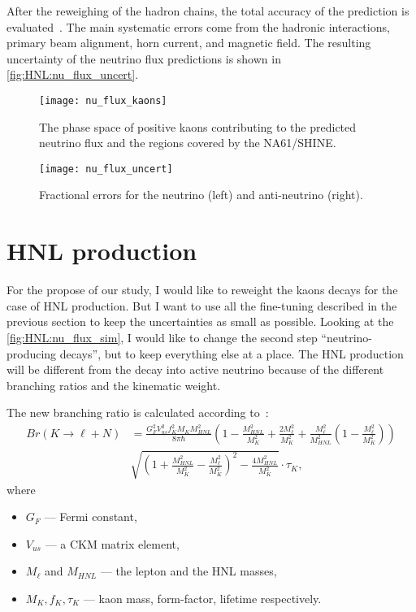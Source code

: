 \documentclass[../main.tex]{subfiles}
\begin{document}
After the reweighing of the hadron chains, the total accuracy of the prediction is evaluated~\cite{Abe2013}. The main systematic errors come from the hadronic interactions, primary beam alignment, horn current, and magnetic field. The resulting uncertainty of the neutrino flux predictions is shown in \autoref{fig:HNL:nu_flux_uncert}.

\begin{figure}[!ht]
    \begin{minipage}[!ht]{0.49\linewidth}
        \centering
        \texttt{[image: nu\_flux\_kaons]}
        \caption{The phase space of positive kaons contributing to the predicted neutrino flux and the regions covered by the NA61/SHINE.}
        \label{fig:HNL:kaon_ps}
    \end{minipage}
    \hfill
    \begin{minipage}[!ht]{0.49\linewidth}
        \centering
        \texttt{[image: nu\_flux\_uncert]}
        \caption{Fractional errors for the neutrino (left) and anti-neutrino (right).}
        \label{fig:HNL:nu_flux_uncert}
    \end{minipage}
\end{figure}


\section{HNL production}
For the propose of our study, I would like to reweight the kaons decays for the case of HNL production. But I want to use all the fine-tuning described in the previous section to keep the uncertainties as small as possible. Looking at the \autoref{fig:HNL:nu_flux_sim}, I would like to change the second step ``neutrino-producing decays'', but to keep everything else at a place. The HNL production will be different from the decay into active neutrino because of the different branching ratios and the kinematic weight.

The new branching ratio is calculated according to~\cite{Gorbunov2007}:
\begin{equation}
    \begin{split}
    Br(K\rightarrow \ell+N)&=\frac{G_F^2 V_{us}^2 f_K^2 M_K M_{HNL}^2}{8\pi\hbar}\left(1-\frac{M_{HNL}^2}{M_K^2}+\frac{2M_\ell ^2}{M_K^2}+\frac{M_\ell^2}{M_{HNL}^2}\left(1-\frac{M_\ell^2}{M_K^2}\right)\right) \\
&\sqrt{\left(1+\frac{M_{HNL}^2}{M_K^2}-\frac{M_\ell^2}{M_K^2}\right)^2-\frac{4M_{HNL}^2}{M_K^2}} \cdot\tau_K,
    \end{split}
    \label{eq:HNL:Kdecay}
\end{equation}
where
\begin{itemize}
\item $G_F$ --- Fermi constant,
\item $V_{us}$ --- a CKM matrix element,
\item $M_\ell$ and $M_{HNL}$ --- the lepton and the HNL masses,
\item $M_K, f_K, \tau_K$ --- kaon mass, form-factor, lifetime respectively.
\end{itemize}
\end{document}
